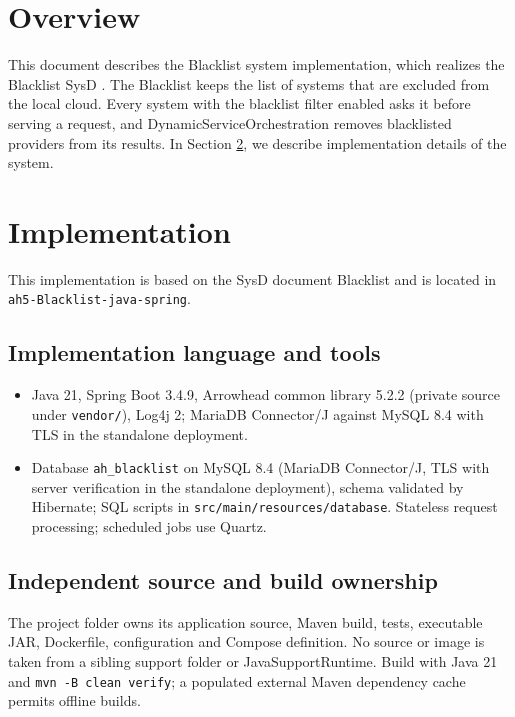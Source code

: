 \documentclass[a4paper]{arrowhead}
\begin{document}
\section{Overview}
\label{sec:overview}

This document describes the Blacklist system implementation, which realizes the Blacklist SysD \cite{bl-sysd}. The Blacklist keeps the list of systems that are excluded from the local cloud. Every system with the blacklist filter enabled asks it before serving a request, and Dynamic\allowbreak{}Service\allowbreak{}Orchestration removes blacklisted providers from its results.
In Section \ref{Implementation}, we describe implementation details of the system.

\newpage

\section{Implementation}
\label{Implementation}

This implementation is based on the SysD document Blacklist \cite{bl-sysd} and is located in \texttt{ah5-Blacklist-java-spring}.

\subsection{Implementation language and tools}
\begin{itemize}
\item Java 21, Spring Boot 3.4.9, Arrowhead common library 5.2.2 (private source under \texttt{vendor/}), Log4j 2; MariaDB Connector/J against MySQL 8.4 with TLS in the standalone deployment.
\item Database \texttt{ah\_\allowbreak{}blacklist} on MySQL 8.4 (MariaDB Connector/J, TLS with server verification in the standalone deployment), schema validated by Hibernate; SQL scripts in \texttt{src/\allowbreak{}main/\allowbreak{}resources/\allowbreak{}database}. Stateless request processing; scheduled jobs use Quartz.
\end{itemize}

\subsection{Independent source and build ownership}
The project folder owns its application source, Maven build, tests, executable JAR, Dockerfile, configuration and Compose definition. No source or image is taken from a sibling support folder or JavaSupportRuntime. Build with Java 21 and \texttt{mvn -B clean verify}; a populated external Maven dependency cache permits offline builds.
\end{document}
